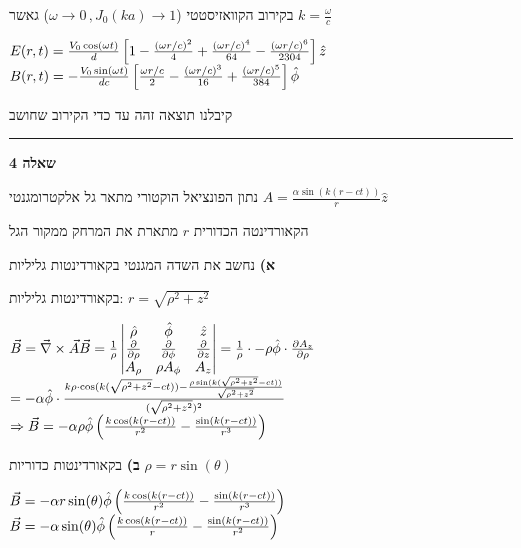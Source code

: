\documentclass[14pt]{extarticle}
\makeatletter
\newenvironment{lefteqs}{%
    \begin{english}%
    \begin{flushleft}%
    \renewcommand{\arraystretch}{1.3}%
    $\begin{array}{@{}l@{}}%
}{%
    \end{array}$%
    \end{flushleft}%
    \end{english}%
}
\makeatother
\begin{document}
בקירוב הקוואזיסטטי ($\omega \to 0 \, ,J_0(ka) \to 1$) גאשר $k=\frac{\omega}{c}$
\begin{lefteqs}
    E(r,t) = \frac{V_0 \cos(\omega t)}{d} \left[1 - \frac{(\omega r / c)^2}{4} + \frac{(\omega r / c)^4}{64} - \frac{(\omega r / c)^6}{2304}\right] \hat{z} \\
    B(r,t) = -\frac{V_0 \sin(\omega t)}{d c} \left[ \frac{\omega r / c}{2} - \frac{(\omega r / c)^3}{16} + \frac{(\omega r / c)^5}{384} \right] \hat{\phi}
\end{lefteqs}

קיבלנו תוצאה זהה עד כדי הקירוב שחושב


\vspace{3em}
\hrule
\vspace{2em}

\textbf{\large שאלה 4}

נתון הפונציאל הוקטורי מתאר גל אלקטרומגנטי $A=\frac{\alpha \sin(k(r-ct))}{r}  \hat{z}$

הקאורדינטה הכדורית $r$ מתארת את המרחק ממקור הגל

\textbf{א)} 
נחשב את השדה המגנטי בקאורדינטות גליליות

בקאורדינטות גליליות: $r=\sqrt{\rho^2 + z^2}$

\begin{lefteqs}
    \vec{B} = \vec{\nabla} \times \vec{A}
    \vec{B} = \frac{1}{\rho} \begin{vmatrix}
        \hat{\rho} & \hat{\phi} & \hat{z} \\
        \frac{\partial}{\partial \rho} & \frac{\partial}{\partial \phi} & \frac{\partial}{\partial z} \\
        A_\rho & \rho A_\phi & A_z
    \end{vmatrix}
    = \frac{1}{\rho} \cdot -\rho \hat{\phi} \cdot \frac{\partial A_z}{\partial \rho} \\
    = -\alpha \hat{\phi} \cdot \frac{k\rho \cdot \cos(k(\sqrt{\rho^2 + z^2} - ct)) - \frac{\rho \sin(k(\sqrt{\rho^2 + z^2} - ct))}{\sqrt{\rho^2 + z^2}}}{(\sqrt{\rho^2 + z^2})^2} \\
    \Rightarrow \vec{B} = -\alpha \rho \hat{\phi} \left( \frac{k\cos(k(r-ct))}{r^2} - \frac{\sin(k(r-ct))}{r^3} \right)
\end{lefteqs}

\textbf{ב)} 
בקאורדינטות כדוריות $\rho=r\sin(\theta)$
\begin{lefteqs}
    \vec{B} = -\alpha r \sin(\theta) \hat{\phi} \left( \frac{k\cos(k(r-ct))}{r^2} - \frac{\sin(k(r-ct))}{r^3} \right) \\
    \Vec{B} = -\alpha \sin(\theta) \hat{\phi} \left( \frac{k\cos(k(r-ct))}{r} - \frac{\sin(k(r-ct))}{r^2} \right)
\end{lefteqs}
\end{document}
